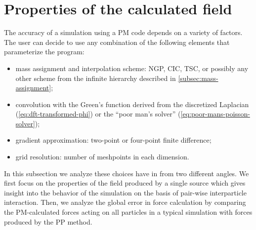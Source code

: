 \section{Properties of the calculated field}
The accuracy of a simulation using a PM code depends on a variety of factors.
The user can decide to use any combination of the following elements that parameterize the program:
\begin{itemize}
    \item mass assignment and interpolation scheme: NGP, CIC, TSC, or possibly any other scheme from the infinite hierarchy described in \autoref{subsec:mass-assignment};
    \item convolution with the Green's function derived from the discretized Laplacian (\autoref{eq:dft-transformed-phi}) or the ``poor man's solver'' (\autoref{eq:poor-mans-poisson-solver});
    \item gradient approximation: two-point or four-point finite difference;
    \item grid resolution: number of meshpoints in each dimension.
\end{itemize}
In this subsection we analyze these choices have in from two different angles.
We first focus on the properties of the field produced by a single source which gives insight into the behavior of the simulation on the basis of pair-wise interparticle interaction.
Then, we analyze the global error in force calculation by comparing the PM-calculated forces acting on all particles in a typical simulation with forces produced by the PP method.

